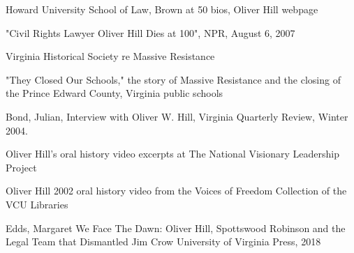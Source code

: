 Howard University School of Law, Brown at 50 bios, Oliver Hill webpage

"Civil Rights Lawyer Oliver Hill Dies at 100", NPR, August 6, 2007

Virginia Historical Society re Massive Resistance

"They Closed Our Schools," the story of Massive Resistance and the
closing of the Prince Edward County, Virginia public schools

Bond, Julian, Interview with Oliver W. Hill, Virginia Quarterly Review,
Winter 2004.

Oliver Hill's oral history video excerpts at The National Visionary
Leadership Project

Oliver Hill 2002 oral history video from the Voices of Freedom
Collection of the VCU Libraries

Edds, Margaret We Face The Dawn: Oliver Hill, Spottswood Robinson and
the Legal Team that Dismantled Jim Crow University of Virginia Press,
2018
